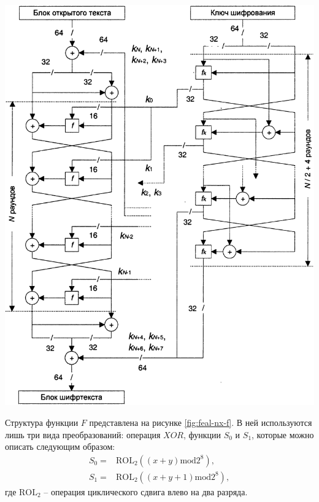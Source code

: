 \noindent
\begin{minipage}{\linewidth}
  \centering
  \vspace{3.5mm}
  \includegraphics[scale=0.2]{./pics/feal-nx-structure.png}
  \label{fig:feal-nx-structure}
  \vspace{3.5mm}
\end{minipage}

Структура функции $F$ представлена на рисунке \ref{fig:feal-nx-f}.
В ней используются лишь три вида преобразований: операция $XOR$,
функции $S_0$ и $S_1$, которые можно описать следующим образом:
\begin{align*}
  S_0 = & \text{ROL}_2((x+y)\text{mod}2^8), \\
  S_1 = & \text{ROL}_2((x+y+1)\text{mod}2^8),
\end{align*}
где $\text{ROL}_2$ -- операция циклического сдвига влево на два разряда.

